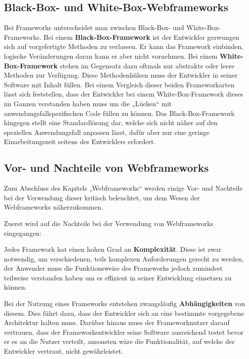 \subsection{Black-Box- und White-Box-Webframeworks}\label{sec:FWTypen}

Bei Frameworks unterscheidet man zwischen Black-Box- und White-Box-Frameworks. Bei einem \textbf{Black-Box-Framework} ist der Entwickler gezwungen sich auf vorgefertigte Methoden zu verlassen. Er kann das Framework einbinden, logische Veränderungen daran kann er aber nicht vornehmen. Bei einem \textbf{White-Box-Framework} stehen im Gegensatz dazu oftmals nur abstrakte oder leere Methoden zur Verfügung. Diese Methodenhülsen muss der Entwickler in seiner Software mit Inhalt füllen. Bei einem Vergleich dieser beiden Frameworkarten lässt sich feststellen, dass der Entwickler bei einem White-Box-Framework dieses im Ganzen verstanden haben muss um die „Lücken“ mit anwendungsfallspezifischen Code füllen zu können. Das Black-Box-Framework hingegen stellt eine Standardlösung dar, welche sich nicht näher auf den speziellen Anwendungsfall anpassen lässt, dafür aber nur eine geringe Einarbeitungszeit seitens des Entwicklers erfordert.\autocites[vgl.][2]{Kojarski2006}

\subsection{Vor- und Nachteile von Webframeworks}

Zum Abschluss des Kapitels „Webframeworks“ werden einige Vor- und Nachteile bei der Verwendung dieser kritisch beleuchtet, um dem Wesen der Webframeworks näherzukommen. 

Zuerst wird auf die Nachteile bei der Verwendung von Webframeworks eingegangen:

Jedes Framework hat einen hohen Grad an \textbf{Komplexität}. Diese ist zwar notwendig, um verschiedenen, teils komplexen Anforderungen gerecht zu werden, der Anwender muss die Funktionsweise des Frameworks jedoch zumindest teilweise verstanden haben um es effizient in seiner Entwicklung einsetzen zu können.

Bei der Nutzung eines Frameworks entstehen zwangsläufig \textbf{Abhängigkeiten} von diesem. Dies führt dazu, dass der Entwickler sich an eine bestimmte vorgegebene Architektur halten muss. Darüber hinaus muss der Frameworknutzer darauf vertrauen, dass der Frameworkentwickler seine Software ausreichend testet bevor er es an die Nutzer verteilt, ansonsten wäre die Funktionalität, auf welche der Entwickler vertraut, nicht gewährleistet.

